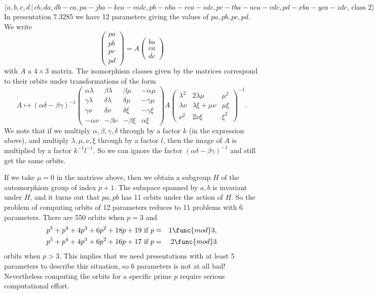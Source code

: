 \documentclass[10pt]{article}
\begin{document}
\begin{equation}
\langle
a,b,c,d\,|%
\,cb,da,db-ca,pa-jba-kca-mdc,pb-nba-rca-sdc,pc-tba-uca-vdc,pd-xba-yca-zdc,\,%
\text{class }2\rangle  \tag{7.3285}
\end{equation}%
In presentation 7.3285 we have 12 parameters giving the values of $%
pa,pb,pc,pd$. We write%
\[
\left( 
\begin{array}{c}
pa \\ 
pb \\ 
pc \\ 
pd%
\end{array}%
\right) =A\left( 
\begin{array}{c}
ba \\ 
ca \\ 
dc%
\end{array}%
\right) 
\]%
with $A$ a $4\times 3$ matrix. The isomorphism classes given by the matrices
correspond to their orbits under transformations of the form 
\[
A\longmapsto (\alpha \delta -\beta \gamma )^{-1}\left( 
\begin{array}{cccc}
\alpha \lambda & \beta \lambda & \beta \mu & -\alpha \mu \\ 
\gamma \lambda & \delta \lambda & \delta \mu & -\gamma \mu \\ 
\gamma \nu & \delta \nu & \delta \xi & -\gamma \xi \\ 
-\alpha \nu & -\beta \nu & -\beta \xi & \alpha \xi%
\end{array}%
\right) A\left( 
\begin{array}{ccc}
\lambda ^{2} & 2\lambda \mu & \mu ^{2} \\ 
\lambda \nu & \lambda \xi +\mu \nu & \mu \xi \\ 
\nu ^{2} & 2\nu \xi & \xi ^{2}%
\end{array}%
\right) ^{-1}. 
\]%
We note that if we multiply $\alpha ,\beta ,\gamma ,\delta $ through by a
factor $k$ (in the expression above), and multiply $\lambda ,\mu ,\nu ,\xi $
through by a factor $l$, then the image of $A$ is multiplied by a factor $%
k^{-1}l^{-1}$. So we can ignore the factor $(\alpha \delta -\beta \gamma
)^{-1}$ and still get the same orbits.

If we take $\mu =0$ in the matrices above, then we obtain a subgroup $H$ of
the automorphism group of index $p+1$. The subspace spanned by $a,b$ is
invariant under $H$, and it turns out that $pa,pb$ has 11 orbits under the
action of $H$. So the problem of computing orbits of 12 parameters reduces
to 11 problems with 6 parameters. There are 550 orbits when $p=3$ and 
\begin{eqnarray*}
\allowbreak p^{5}+p^{4}+4p^{3}+6p^{2}+18p+19\text{ if }p &=&1\func{mod}3, \\
\allowbreak p^{5}+p^{4}+4p^{3}+6p^{2}+16p+17\text{ if }p &=&2\func{mod}3
\end{eqnarray*}%
orbits when $p>3$. This implies that we need presentations with at least 5
parameters to describe this situation, so 6 parameters is not at all bad!
Nevertheless computing the orbits for a specific prime $p$ require serious
computational effort.
\end{document}
